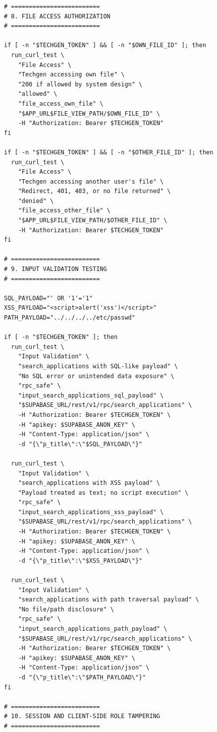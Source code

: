 \begin{lstlisting}[style=bashcode, caption={IRIS limited-scope penetration testing script}, label={lst:iris-pentest-script}]
# =========================
# 8. FILE ACCESS AUTHORIZATION
# =========================

if [ -n "$TECHGEN_TOKEN" ] && [ -n "$OWN_FILE_ID" ]; then
  run_curl_test \
    "File Access" \
    "Techgen accessing own file" \
    "200 if allowed by system design" \
    "allowed" \
    "file_access_own_file" \
    "$APP_URL$FILE_VIEW_PATH/$OWN_FILE_ID" \
    -H "Authorization: Bearer $TECHGEN_TOKEN"
fi

if [ -n "$TECHGEN_TOKEN" ] && [ -n "$OTHER_FILE_ID" ]; then
  run_curl_test \
    "File Access" \
    "Techgen accessing another user's file" \
    "Redirect, 401, 403, or no file returned" \
    "denied" \
    "file_access_other_file" \
    "$APP_URL$FILE_VIEW_PATH/$OTHER_FILE_ID" \
    -H "Authorization: Bearer $TECHGEN_TOKEN"
fi

# =========================
# 9. INPUT VALIDATION TESTING
# =========================

SQL_PAYLOAD="' OR '1'='1"
XSS_PAYLOAD="<script>alert('xss')</script>"
PATH_PAYLOAD="../../../../etc/passwd"

if [ -n "$TECHGEN_TOKEN" ]; then
  run_curl_test \
    "Input Validation" \
    "search_applications with SQL-like payload" \
    "No SQL error or unintended data exposure" \
    "rpc_safe" \
    "input_search_applications_sql_payload" \
    "$SUPABASE_URL/rest/v1/rpc/search_applications" \
    -H "Authorization: Bearer $TECHGEN_TOKEN" \
    -H "apikey: $SUPABASE_ANON_KEY" \
    -H "Content-Type: application/json" \
    -d "{\"p_title\":\"$SQL_PAYLOAD\"}"

  run_curl_test \
    "Input Validation" \
    "search_applications with XSS payload" \
    "Payload treated as text; no script execution" \
    "rpc_safe" \
    "input_search_applications_xss_payload" \
    "$SUPABASE_URL/rest/v1/rpc/search_applications" \
    -H "Authorization: Bearer $TECHGEN_TOKEN" \
    -H "apikey: $SUPABASE_ANON_KEY" \
    -H "Content-Type: application/json" \
    -d "{\"p_title\":\"$XSS_PAYLOAD\"}"

  run_curl_test \
    "Input Validation" \
    "search_applications with path traversal payload" \
    "No file/path disclosure" \
    "rpc_safe" \
    "input_search_applications_path_payload" \
    "$SUPABASE_URL/rest/v1/rpc/search_applications" \
    -H "Authorization: Bearer $TECHGEN_TOKEN" \
    -H "apikey: $SUPABASE_ANON_KEY" \
    -H "Content-Type: application/json" \
    -d "{\"p_title\":\"$PATH_PAYLOAD\"}"
fi

# =========================
# 10. SESSION AND CLIENT-SIDE ROLE TAMPERING
# =========================


\end{lstlisting}
